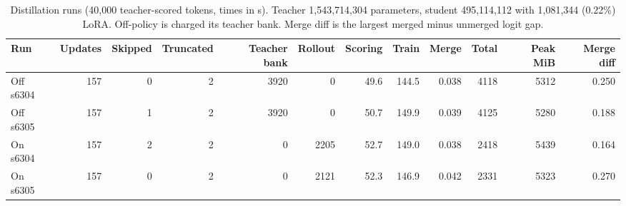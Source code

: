 \begin{table}[!htb]
\centering
\scriptsize
\setlength{\tabcolsep}{3.5pt}
\caption{Distillation runs (40,000 teacher-scored tokens, times in s). Teacher 1,543,714,304 parameters, student 495,114,112 with 1,081,344 (0.22\%) LoRA. Off-policy is charged its teacher bank. Merge diff is the largest merged minus unmerged logit gap.}
\label{tab:t3cost}
\begin{adjustbox}{max width=\linewidth}
\begin{tabular}{lrrrrrrrrrrr}
\toprule
Run & Updates & Skipped & Truncated & Teacher bank & Rollout & Scoring & Train & Merge & Total & Peak MiB & Merge diff \\
\midrule
Off s6304 & 157 & 0 & 2 & 3920 & 0 & 49.6 & 144.5 & 0.038 & 4118 & 5312 & 0.250 \\
Off s6305 & 157 & 1 & 2 & 3920 & 0 & 50.7 & 149.9 & 0.039 & 4125 & 5280 & 0.188 \\
On s6304 & 157 & 2 & 2 & 0 & 2205 & 52.7 & 149.0 & 0.038 & 2418 & 5439 & 0.164 \\
On s6305 & 157 & 0 & 2 & 0 & 2121 & 52.3 & 146.9 & 0.042 & 2331 & 5323 & 0.270 \\
\bottomrule
\end{tabular}
\end{adjustbox}
\end{table}
